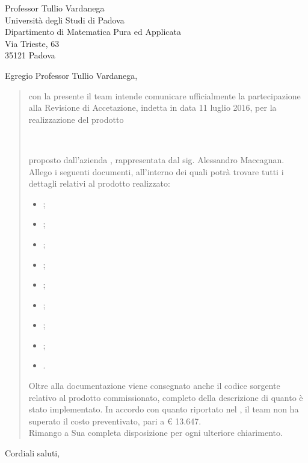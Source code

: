 \date{Padova, 11 Luglio 2016}
\begin{letter}{
	Professor Tullio Vardanega \\
	Università degli Studi di Padova \\
	Dipartimento di Matematica Pura ed Applicata \\
	Via Trieste, 63 \\
	35121 Padova
}
\signature{
\begin{center}
\textit{
\Responsabile{} \\
Responsabile \GroupName{}
}
\texttt{[image: res/MatteoDiPirro.png]}
\end{center}
}
\opening{Egregio Professor Tullio Vardanega,}
\begin{quotation}
con la presente il team \GroupName{} intende comunicare ufficialmente la partecipazione alla Revisione di Accetazione, indetta in data 11 luglio 2016, per la realizzazione del prodotto \\ 
\begin{center}
\textbf{\ProjectName{}} \\
\end{center} proposto dall'azienda \Proponente, rappresentata dal sig. Alessandro Maccagnan. \\
Allego i seguenti documenti, all'interno dei quali potrà trovare tutti i dettagli relativi al prodotto realizzato:
\begin{itemize}
\item \AnalisiDeiRequisiti{};
\item \Glossario{};
\item \NormeDiProgetto{};
\item \PianoDiProgetto{};
\item \PianoDiQualifica{};
\item \SpecificaTecnica{};
\item \ManualeUtente{};
\item \ManualeSviluppatore{};
\item \ManualeAdmin{}.
\end{itemize}
Oltre alla documentazione viene consegnato anche il codice sorgente relativo al prodotto commissionato, completo della descrizione di quanto è stato implementato.
In accordo con quanto riportato nel \PianoDiProgetto, il team non ha superato il costo preventivato, pari a \euro{} 13.647. \\
Rimango a Sua completa disposizione per ogni ulteriore chiarimento.
\end{quotation}
\closing{Cordiali saluti,}
\end{letter}
